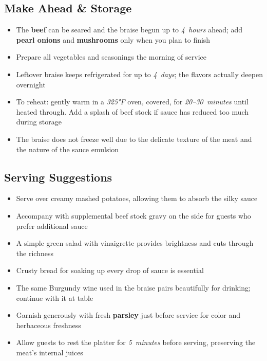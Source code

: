 \documentclass[11pt,letterpaper]{article}
\begin{document}
{\begin{multicols}{2}
\subsection*{Make Ahead \& Storage}
\begin{itemize}
    \item The \textbf{beef} can be seared and the braise begun up to \textit{4~hours} ahead; add \textbf{pearl onions} and \textbf{mushrooms} only when you plan to finish
    \item Prepare all vegetables and seasonings the morning of service
    \item Leftover braise keeps refrigerated for up to \textit{4~days}; the flavors actually deepen overnight
    \item To reheat: gently warm in a \textit{325°F} oven, covered, for \textit{20--30~minutes} until heated through. Add a splash of beef stock if sauce has reduced too much during storage
    \item The braise does not freeze well due to the delicate texture of the meat and the nature of the sauce emulsion
\end{itemize}

\subsection*{Serving Suggestions}
\begin{itemize}
    \item Serve over creamy mashed potatoes, allowing them to absorb the silky sauce
    \item Accompany with supplemental beef stock gravy on the side for guests who prefer additional sauce
    \item A simple green salad with vinaigrette provides brightness and cuts through the richness
    \item Crusty bread for soaking up every drop of sauce is essential
    \item The same Burgundy wine used in the braise pairs beautifully for drinking; continue with it at table
    \item Garnish generously with fresh \textbf{parsley} just before service for color and herbaceous freshness
    \item Allow guests to rest the platter for \textit{5~minutes} before serving, preserving the meat's internal juices
\end{itemize}

\end{multicols}
}
\end{document}
